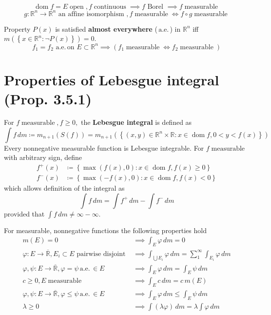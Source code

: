 \documentclass[letterpaper,11pt,intlimits,sumlimits]{amsart}
\newcommand{\closure}[1]{\overline{#1}}
\newcommand{\reals}{\mathbb{R}}
\newcommand{\keyphrase}[1]{\textbf{#1}}
\newcommand{\almosteverywhere}{\,\textrm{a.e.}\,}
\DeclareMathOperator{\open}{open}
\DeclareMathOperator{\dom}{dom}
\DeclareMathOperator{\continuous}{continuous}
\DeclareMathOperator{\measurable}{measurable}
\begin{document}
\[
    \dom f = E \open, f \continuous
    \implies f \textrm{ Borel } \implies f \measurable
\]
\[
    g:\reals^{n}\to\reals^{n} \text{ an affine isomorphism },
    f \measurable \iff f\circ{}g \measurable
\]

Property $P\left( x \right)$ is satisfied \keyphrase{almost everywhere}
($\almosteverywhere$) in $\reals^{n}$ iff 
$m\left(\left\{ x\in\reals^{n} : \neg{}P\left( x \right) \right\}\right) = 0$.
\[
    f_{1} = f_{2} \,\almosteverywhere \text{on } E\subset\reals^{n}
    \implies \left( f_{1} \measurable \iff f_{2} \measurable \right)
\]

\section*{Properties of Lebesgue integral (Prop. 3.5.1)}

For $f \measurable, f\geq{}0,$ the 
\keyphrase{Lebesgue integral} is defined as
\[
    \int f \, dm \coloneqq m_{n+1}\left(S\left(f\right)\right) = 
    m_{n+1}\left(\left\{ 
        (x,y)\in\reals^{n}\times\reals : x\in\dom f, 0 < y < f(x)
    \right\}\right)
\]
Every nonnegative
measurable function is Lebesgue integrable.
For $f \measurable$ with arbitrary sign, define
\begin{align*}
    f^{+}(x) &\coloneqq \left\{ 
        \max\left( f(x), 0 \right) : x\in\dom{}f, f(x)\geq{}0 
    \right\}
    \\
    f^{-}(x) &\coloneqq \left\{ 
        \max\left( -f(x), 0 \right) : x\in\dom{}f, f(x)<0 
    \right\}
\end{align*}
which allows definition of the integral as
\[
    \int f \, dm = \int f^{+} \, dm - \int f^{-} \, dm
\]
provided that $\int f \, dm \neq \infty - \infty$.  

For measurable, nonnegative functions the following properties hold
\begin{align*}
    m(E) = 0 &\implies \int_{E} \varphi \, dm = 0
    \tag{3.5.1 i} \\
    \varphi:E\to\closure{\reals}, E_{i}\subset{}E \text{ pairwise disjoint }
    &\implies 
    \int_{\bigcup{}E_{i}}\varphi\,dm 
    = \sum_{1}^{\infty} \int_{E_{i}} \varphi \, dm
    \tag{3.5.1 ii} \\
    \varphi,\psi:E\to\closure{\reals}, \varphi=\psi \almosteverywhere \in E
    &\implies
    \int_{E}\varphi\,dm = \int_{E}\psi\,dm
    \tag{3.5.1 iii} \\
    c\geq{}0, E \measurable 
    &\implies
    \int_{E}c\,dm = c\,m(E)
    \tag{3.5.1 iv} \\
    \varphi,\psi:E\to\closure{\reals}, \varphi\leq\psi \almosteverywhere \in E
    &\implies
    \int_{E}\varphi\,dm \leq \int_{E}\psi\,dm
    \tag{3.5.1 v} \\
    \lambda\geq{}0
    &\implies
    \int\left( \lambda \varphi \right) \, dm = \lambda \int \varphi \, dm
    \tag{3.5.1 vi}
\end{align*}
\end{document}
